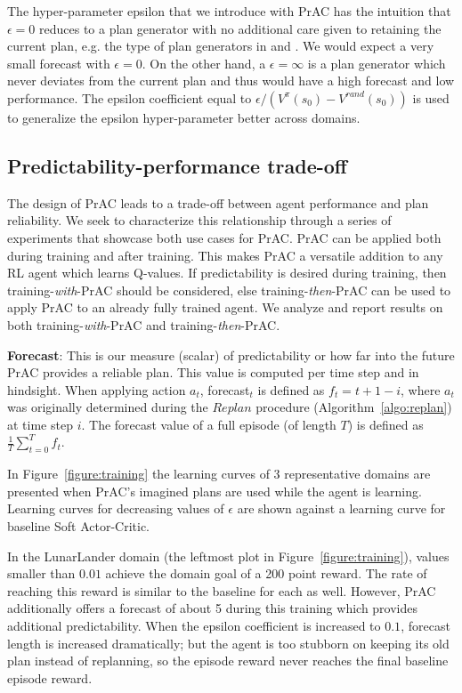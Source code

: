 \documentclass[letterpaper]{article} %
\begin{document}
            The hyper-parameter epsilon that we introduce with PrAC has the intuition that $\epsilon=0$ reduces to a plan generator with no additional care given to retaining the current plan, e.g. the type of plan generators in \cite{racaniere2017imagination} and \cite{kim2020communication}. We would expect a very small forecast with $\epsilon=0$. On the other hand, a $\epsilon=\infty$ is a plan generator which never deviates from the current plan and thus would have a high forecast and low performance. The epsilon coefficient equal to $\epsilon / (V^{\pi}(s_0)-V^{rand}(s_0))$ is used to generalize the epsilon hyper-parameter better across domains.



        \subsection{Predictability-performance trade-off}
            The design of PrAC leads to a trade-off between agent performance and plan reliability. We seek to characterize this relationship through a series of experiments that showcase both use cases for PrAC. PrAC can be applied both during training and after training. This makes PrAC a versatile addition to any RL agent which learns Q-values. If predictability is desired during training, then training-\textit{with}-PrAC should be considered, else training-\textit{then}-PrAC can be used to apply PrAC to an already fully trained agent. We analyze and report results on both training-\textit{with}-PrAC and training-\textit{then}-PrAC.

            \textbf{Forecast}: This is our measure (scalar) of predictability or how far into the future PrAC provides a reliable plan. This value is computed per time step and in hindsight. When applying action $a_t$, forecast$_t$ is defined as $f_t=t+1-i$, where $a_t$ was originally determined during the $Replan$ procedure (Algorithm~\ref{algo:replan}) at time step $i$. The forecast value of a full episode (of length $T$) is defined as $\frac{1}{T}\sum_{t=0}^Tf_t$.

            In Figure~\ref{figure:training} the learning curves of 3 representative domains are presented when PrAC's imagined plans are used while the agent is learning. Learning curves for decreasing values of $\epsilon$ are shown against a learning curve for baseline Soft Actor-Critic.

            In the LunarLander domain (the leftmost plot in Figure~\ref{figure:training}), values smaller than $0.01$ achieve the domain goal of a 200 point reward. The rate of reaching this reward is similar to the baseline for each as well. However, PrAC additionally offers a forecast of about 5 during this training which provides additional predictability. When the epsilon coefficient is increased to $0.1$, forecast length is increased dramatically; but the agent is too stubborn on keeping its old plan instead of replanning, so the episode reward never reaches the final baseline episode reward.
\end{document}

